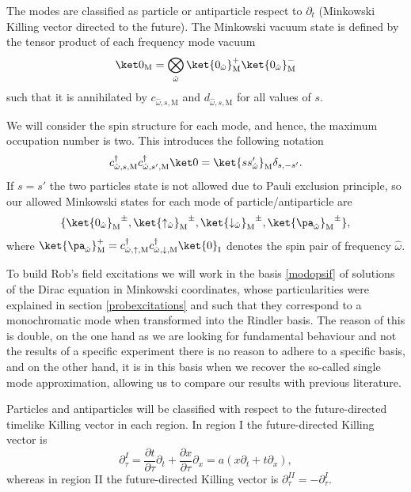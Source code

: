 The modes are classified as particle or antiparticle respect to $\partial_t$ (Minkowski Killing vector directed to the future). The Minkowski vacuum state is defined by the tensor product of each frequency mode vacuum
\begin{equation}\label{vacua}\ket0_{\text{M}}=\bigotimes_{\hat\omega}\ket{0_{\hat\omega}}^+_{\text{M}}\ket{0_{\hat\omega}}_{\text{M}}^-\end{equation}
such that it is annihilated by $c_{\hat\omega,s,\text{M}}$ and $d_{\hat\omega,s,\text{M}}$ for all values of $s$.

We will consider the spin structure for each mode, and hence, the maximum occupation number is two. This introduces the following notation
\begin{equation}c^\dagger_{\hat\omega,s,\text{M}}c^\dagger_{\hat\omega,s',\text{M}}\ket0=\ket{ss'_{\hat\omega}}_\text{M}\delta_{s,{-s'}}.\end{equation}
If $s=s'$ the two particles state is not allowed due to Pauli exclusion principle, so our allowed Minkowski states for each mode of particle/antiparticle are
\begin{equation}\{{\ket{0_{\hat\omega}}_\text{M}}^\pm,{\ket{\uparrow_{\hat\omega}}_\text{M}}^\pm,{\ket{\downarrow_{\hat\omega}}_\text{M}}^\pm,{\ket{\pa_{\hat\omega}}_\text{M}}^\pm\},\end{equation}
where $\ket{\pa_{\hat\omega}}^+_\text{M}=c^\dagger_{\hat\omega,\uparrow,\text{M}}c^\dagger_{\hat\omega,\downarrow,\text{M}}\ket{0}_\text{I}$ denotes the spin pair of frequency $\hat\omega$.

To build Rob's field excitations we will work  in the basis \eqref{modopsif} of solutions of the Dirac equation in Minkowski coordinates, whose particularities were explained in section \ref{probexcitations} and such that they correspond to a monochromatic mode when transformed into the Rindler basis. The reason of this is double, on the one hand as we are looking for fundamental behaviour and not the results of a specific experiment there is no reason to adhere to a specific basis, and on the other hand, it is in this basis when we recover the so-called single mode approximation, allowing us to compare our results with previous literature.

Particles and antiparticles will be classified with respect to the future-directed timelike Killing vector in each region. In region I the future-directed Killing vector is
\begin{equation}\label{KillingI}
\partial_\tau^I=\frac{\partial  t}{\partial \tau}\partial_{t}+\frac{\partial x}{\partial \tau}\partial_{x}=a(x\partial_{t}+t\partial_{x}),
\end{equation}
whereas in region II the future-directed Killing vector is $\partial_\tau^{II}=-\partial_\tau^{I}$.

